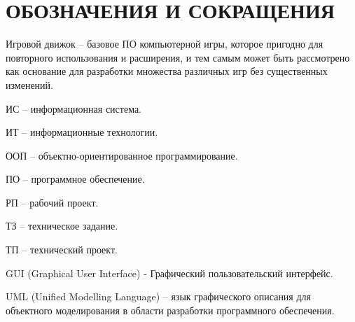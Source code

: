 \section*{ОБОЗНАЧЕНИЯ И СОКРАЩЕНИЯ}

Игровой движок -- базовое ПО компьютерной игры, которое пригодно для повторного использования и расширения, и тем самым может быть рассмотрено как основание для разработки множества различных игр без существенных изменений.

ИС -- информационная система.

ИТ -- информационные технологии. 

ООП -- объектно-ориентированное программирование.

ПО -- программное обеспечение.

РП -- рабочий проект.

ТЗ -- техническое задание.

ТП -- технический проект.

GUI (Graphical User Interface) - Графический пользовательский интерфейс.

UML (Unified Modelling Language) -- язык графического описания для объектного моделирования в области разработки программного обеспечения.
